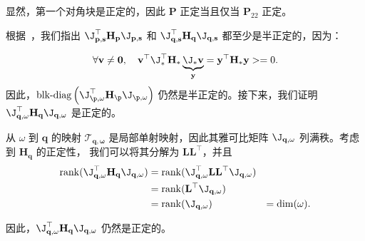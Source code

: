 显然，第一个对角块是正定的，因此 $\mathbf{P}$ 正定当且仅当 $\mathbf{P}_{22}$ 正定。

根据~，我们指出 $\J_{\mathbf{p, s}}^{\top}\mathbf{H}_{\mathbf{p}}\J_{\mathbf{p, s}}$ 和 $\J_{\mathbf{q, s}}^{\top}\mathbf{H}_{\mathbf{q}}\J_{\mathbf{q, s}}$ 都至少是半正定的，因为：

\begin{equation}
  \forall \mathbf{v} \ne \mathbf{0}, \quad
  \mathbf{v}^{\top}\J_{*}^{\top}\mathbf{H}_{*}\underbrace{\J_{*} \mathbf{v}}_{\mathbf{y}} = \mathbf{y}^{\top}
  \mathbf{H}_{*}\mathbf{y} >= 0.
\end{equation}
因此，$\operatorname{blk-diag}\left(\J_{\p, \omega}^\top \mathbf{H}_{\p} \J_{\p,
    \omega}\right)$ 仍然是半正定的。接下来，我们证明 $\J_{\mathbf{q,\omega}}^{\top}\mathbf{H}_{\mathbf{q}}\J_{\mathbf{q,\omega}}$ 是正定的。

从 $\omega$ 到 $\mathbf{q}$ 的映射 $\mathcal{T}_{\mathbf{q,\omega}}$ 是局部单射映射，因此其雅可比矩阵 $\J_{\mathbf{q,\omega}}$ 列满秩。考虑到 $\mathbf{H_{\mathbf q}}$ 的正定性，
我们可以将其分解为 $\mathbf{LL}^{\top}$，并且
\begin{equation}
  \begin{aligned}
    \mathrm{rank}(\J_{\mathbf{q,\omega}}^{\top}\mathbf{H}_{\mathbf{q}}\J_{\mathbf{q,\omega}})
     & =
    \mathrm{rank}(\J_{\mathbf{q,\omega}}^{\top}\mathbf{LL}^{\top}\J_{\mathbf{q,\omega}}) \\
     & =\mathrm{rank}(\mathbf{L}^{\top}\J_{\mathbf{q,\omega}})                           \\
     & =\mathrm{rank}(\J_{\mathbf{q,\omega}})
     & =\mathrm{dim}(\omega).
  \end{aligned}
\end{equation}

因此，$\J_{\mathbf{q,\omega}}^{\top}\mathbf{H}_{\mathbf{q}}\J_{\mathbf{q,\omega}}$ 仍然是正定的。

